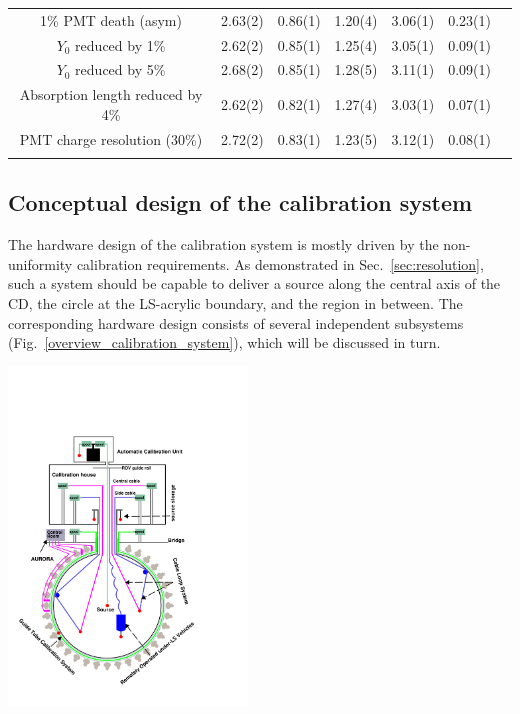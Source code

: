 \documentclass[a4paper,10pt,twoside]{cpc-hepnp}
\begin{document}
\begin{CJK*}{GB}{gbsn}
\begin{center}
\begin{tabular*}{170mm}{@{\extracolsep{\fill}}ccccccc}
    1\% PMT death (asym) &2.63(2) & 0.86(1) & 1.20(4) & 3.06(1) & 0.23(1) \\
    $Y_0$ reduced by 1\% & 2.62(2) & 0.85(1) & 1.25(4) & 3.05(1) & 0.09(1) \\
    $Y_0$ reduced by 5\% & 2.68(2) & 0.85(1) & 1.28(5) & 3.11(1) & 0.09(1) \\
    Absorption length reduced by 4\% &2.62(2) & 0.82(1) & 1.27(4) & 3.03(1) & 0.07(1)\\
    PMT charge resolution (30\%) &2.72(2) & 0.83(1) & 1.23(5) & 3.12(1) & 0.08(1) \\
    \bottomrule  %
    \label{summary_resolution}
  \end{tabular*}
\end{center}
\begin{multicols}{2}

\section{Conceptual design of the calibration system}
\label{sec:CalibSys}
The hardware design of the calibration system is mostly driven by the
non-uniformity calibration requirements. As demonstrated in
Sec.~{\ref{sec:resolution}}, such a system should be capable to deliver
a source along the central axis of the CD, the circle at the
LS-acrylic boundary, and the region in between. The corresponding
hardware design consists of several independent subsystems
(Fig.~\ref{overview_calibration_system}), which will be discussed in
turn.

\begin{center}
  \includegraphics[width=2.5in]{calib_systems.pdf}
  \label{overview_calibration_system}
\end{center}


\end{multicols}
\end{CJK*}
\end{document}
